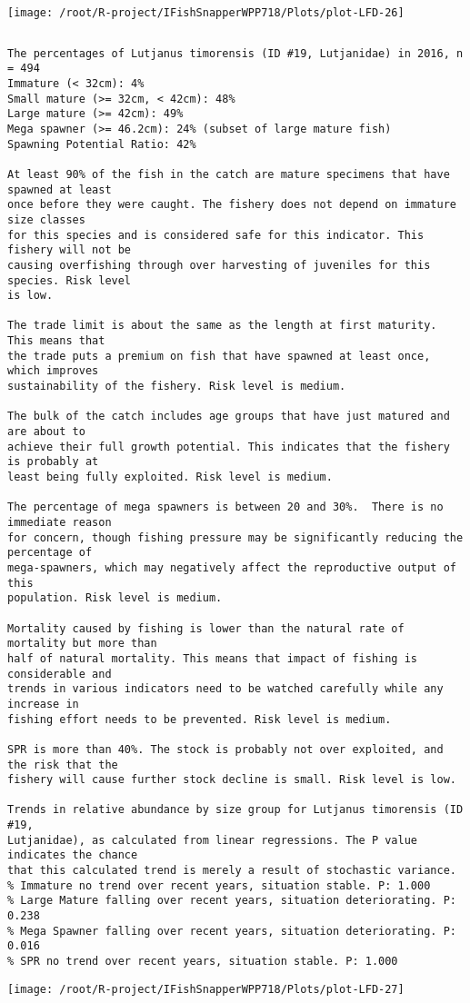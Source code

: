 \documentclass{report}\usepackage[]{graphicx}\usepackage[]{color}
\makeatletter
\def\maxwidth{ %
  \ifdim\Gin@nat@width>\linewidth
    \linewidth
  \else
    \Gin@nat@width
  \fi
}
\newenvironment{kframe}{%
 \def\at@end@of@kframe{}%
 \ifinner\ifhmode%
  \def\at@end@of@kframe{\end{minipage}}%
  \begin{minipage}{\columnwidth}%
 \fi\fi%
 \def\FrameCommand##1{\hskip\@totalleftmargin \hskip-\fboxsep
 \colorbox{shadecolor}{##1}\hskip-\fboxsep
     \hskip-\linewidth \hskip-\@totalleftmargin \hskip\columnwidth}%
 \MakeFramed {\advance\hsize-\width
   \@totalleftmargin\z@ \linewidth\hsize
   \@setminipage}}%
 {\par\unskip\endMakeFramed%
 \at@end@of@kframe}
\newenvironment{knitrout}{}{} %
\makeatother
\begin{document}
\begin{knitrout}
\texttt{[image: /root/R-project/IFishSnapperWPP718/Plots/plot-LFD-26]} 
\begin{kframe}\begin{verbatim}
\end{verbatim}
\end{kframe}
\clearpage
\newpage
\begin{kframe}\begin{verbatim}The percentages of Lutjanus timorensis (ID #19, Lutjanidae) in 2016, n = 494
Immature (< 32cm): 4%
Small mature (>= 32cm, < 42cm): 48%
Large mature (>= 42cm): 49%
Mega spawner (>= 46.2cm): 24% (subset of large mature fish)
Spawning Potential Ratio: 42%
 
At least 90% of the fish in the catch are mature specimens that have spawned at least
once before they were caught. The fishery does not depend on immature size classes
for this species and is considered safe for this indicator. This fishery will not be
causing overfishing through over harvesting of juveniles for this species. Risk level
is low.

The trade limit is about the same as the length at first maturity.  This means that
the trade puts a premium on fish that have spawned at least once, which improves
sustainability of the fishery. Risk level is medium.

The bulk of the catch includes age groups that have just matured and are about to
achieve their full growth potential. This indicates that the fishery is probably at
least being fully exploited. Risk level is medium.

The percentage of mega spawners is between 20 and 30%.  There is no immediate reason
for concern, though fishing pressure may be significantly reducing the percentage of
mega-spawners, which may negatively affect the reproductive output of this
population. Risk level is medium.
 
Mortality caused by fishing is lower than the natural rate of mortality but more than
half of natural mortality. This means that impact of fishing is considerable and
trends in various indicators need to be watched carefully while any increase in
fishing effort needs to be prevented. Risk level is medium.
 
SPR is more than 40%. The stock is probably not over exploited, and the risk that the
fishery will cause further stock decline is small. Risk level is low.
 
Trends in relative abundance by size group for Lutjanus timorensis (ID #19,
Lutjanidae), as calculated from linear regressions. The P value indicates the chance
that this calculated trend is merely a result of stochastic variance.
% Immature no trend over recent years, situation stable. P: 1.000
% Large Mature falling over recent years, situation deteriorating. P: 0.238
% Mega Spawner falling over recent years, situation deteriorating. P: 0.016
% SPR no trend over recent years, situation stable. P: 1.000
\end{verbatim}
\end{kframe}
\texttt{[image: /root/R-project/IFishSnapperWPP718/Plots/plot-LFD-27]} 


\end{knitrout}
\end{document}

